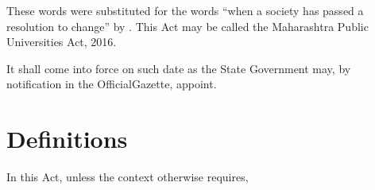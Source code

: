 \documentclass[reprint]{mhact}
\begin{document}
      \begin{subsectionlist}
    

  \begin{amendins}{These words were substituted for the words ``when a
      society has passed a resolution to change'' by
      .}
    This Act may be called the Maharashtra Public Universities Act,
    2016.
 \end{amendins} 
    

It shall come into force on such date as the State Government may, by notification in the OfficialGazette, appoint.

       \end{subsectionlist}
    
      \section{Definitions}
      
In this Act, unless the context otherwise requires,
\end{document}
